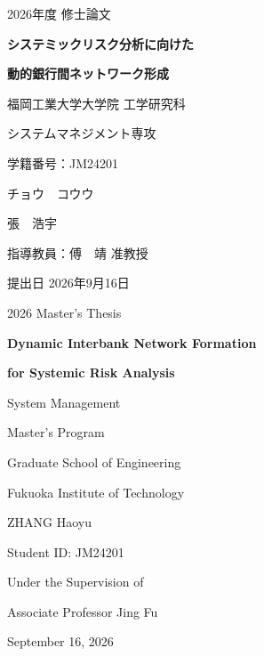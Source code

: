 \begin{titlepage}
\thispagestyle{empty}
\centering
{\Large 2026年度 修士論文\par}
\vspace{2.6cm}
{\LARGE\bfseries システミックリスク分析に向けた\par}
\vspace{0.4cm}
{\LARGE\bfseries 動的銀行間ネットワーク形成\par}
\vfill
{\large 福岡工業大学大学院 工学研究科\par}
\vspace{0.35cm}
{\large システムマネジメント専攻\par}
\vspace{1.5cm}
{\large 学籍番号：JM24201\par}
\vspace{0.25cm}
{\large チョウ　コウウ\par}
{\large 張　浩宇\par}
\vspace{1.35cm}
{\large 指導教員：傅　靖 准教授\par}
\vfill
{\large 提出日 2026年9月16日\par}
\end{titlepage}

\begin{titlepage}
\thispagestyle{empty}
\centering
{\Large 2026 Master's Thesis\par}
\vspace{2.2cm}
{\LARGE\bfseries Dynamic Interbank Network Formation\par}
\vspace{0.35cm}
{\LARGE\bfseries for Systemic Risk Analysis\par}
\vfill
{\large System Management\par}
{\large Master's Program\par}
{\large Graduate School of Engineering\par}
{\large Fukuoka Institute of Technology\par}
\vspace{1.5cm}
{\large ZHANG Haoyu\par}
{\large Student ID: JM24201\par}
\vspace{1.35cm}
{\large Under the Supervision of\par}
{\large Associate Professor Jing Fu\par}
\vfill
{\large September 16, 2026\par}
\end{titlepage}

